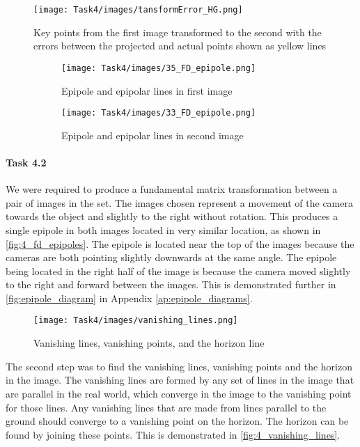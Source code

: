\begin{figure}
    \centering
    \texttt{[image: Task4/images/tansformError\_HG.png]}
    \caption{Key points from the first image transformed to the second with the errors between the projected and actual points shown as yellow lines}
    \label{fig:4_hg_transform_error}
\end{figure}

\begin{figure}
    \centering
    \begin{subfigure}{0.49\linewidth}
        \centering
        \texttt{[image: Task4/images/35\_FD\_epipole.png]}
        \caption{Epipole and epipolar lines \linebreak in first image}
        \label{subfig:4_fd_epipoles:1}
    \end{subfigure}
    \begin{subfigure}{0.49\linewidth}
        \centering
        \texttt{[image: Task4/images/33\_FD\_epipole.png]}
        \caption{Epipole and epipolar lines in second image}
        \label{subfig:4_fd_epipoles:2}
    \end{subfigure}
    \caption{}
    \label{fig:4_fd_epipoles}
\end{figure}

\paragraph{Task 4.2} We were required to produce a fundamental matrix transformation between a pair of images in the \FD set. The images chosen represent a movement of the camera towards the object and slightly to the right without rotation. This produces a single epipole in both images located in very similar location, as shown in \autoref{fig:4_fd_epipoles}. The epipole is located near the top of the images because the cameras are both pointing slightly downwards at the same angle. The epipole being located in the right half of the image is because the camera moved slightly to the right and forward between the images. This is demonstrated further in \autoref{fig:epipole_diagram} in Appendix \ref{ap:epipole_diagrams}. 

\begin{figure}
    \centering
    \texttt{[image: Task4/images/vanishing\_lines.png]}
    \caption{Vanishing lines, vanishing points, and the horizon line}
    \label{fig:4_vanishing_lines}
\end{figure}

The second step was to find the vanishing lines, vanishing points and the horizon in the image. The vanishing lines are formed by any set of lines in the image that are parallel in the real world, which converge in the image to the vanishing point for those lines. Any vanishing lines that are made from lines parallel to the ground should converge to a vanishing point on the horizon. The horizon can be found by joining these points. This is demonstrated in \autoref{fig:4_vanishing_lines}.